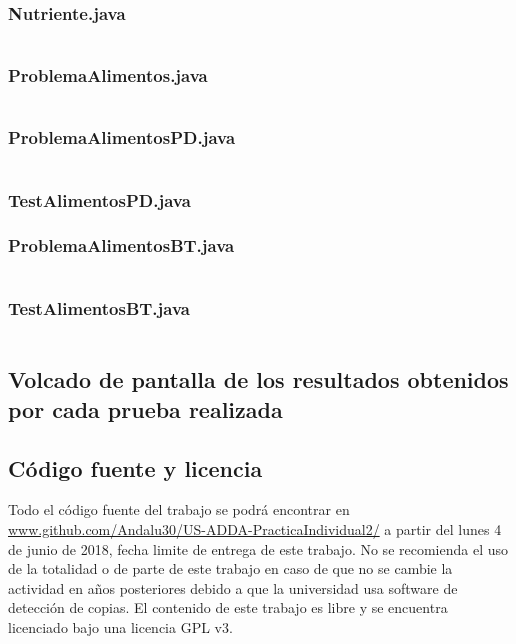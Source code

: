 \documentclass[a4paper,12pt]{article}
\begin{document}
\subsubsection{Nutriente.java}
\inputminted[fontsize=\footnotesize,breaklines]{java}{src/andalu30/PracticaIndividual2/Nutriente.java}
\subsubsection{ProblemaAlimentos.java}
\inputminted[fontsize=\footnotesize,breaklines]{java}{src/andalu30/PracticaIndividual2/ProblemaAlimentos.java}
\subsubsection{ProblemaAlimentosPD.java}
\inputminted[fontsize=\footnotesize,breaklines]{java}{src/andalu30/PracticaIndividual2/ProblemaAlimentosPD.java}
\subsubsection{TestAlimentosPD.java}

\subsubsection{ProblemaAlimentosBT.java}
\inputminted[fontsize=\footnotesize,breaklines]{java}{src/andalu30/PracticaIndividual2/ProblemaAlimentosBT.java}
\subsubsection{TestAlimentosBT.java}
\inputminted[fontsize=\footnotesize,breaklines]{java}{src/andalu30/PracticaIndividual2/TestAlimentosBT.java}



\subsection{Volcado de pantalla de los resultados obtenidos por cada prueba realizada}
\subsection{Código fuente y licencia}
Todo el código fuente del trabajo se podrá encontrar en \url{www.github.com/Andalu30/US-ADDA-PracticaIndividual2/}
a partir del lunes 4 de junio de 2018, fecha limite de entrega de este trabajo.
No se recomienda el uso de la totalidad o de parte de este trabajo en caso de que no se cambie la actividad en años posteriores debido a que la universidad usa software de detección de copias.
El contenido de este trabajo es libre y se encuentra licenciado bajo una licencia GPL v3.\\
\end{document}
